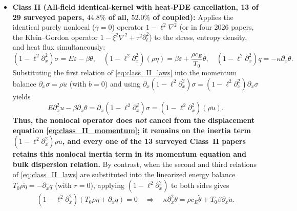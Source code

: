 \begin{itemize}[leftmargin=*]
  \item \textbf{Class II (All-field identical-kernel with heat-PDE cancellation, 13 of 29 surveyed papers, $44.8\%$ of all, $52.0\%$ of coupled):} Applies the identical purely nonlocal ($\gamma = 0$) operator $1 - \ell^2\nabla^2$ (or in four 2026 papers, the Klein--Gordon operator $1 - \xi^2\nabla^2 + \tau^2\partial_t^2$) to the stress, entropy density, and heat flux simultaneously:
  \begin{equation}\label{eq:class_II_laws}
    (1 - \ell^2\partial_x^2)\sigma = E\varepsilon - \beta\theta, \quad
    (1 - \ell^2\partial_x^2)(\rho\eta) = \beta\varepsilon + \frac{\rho c_E}{T_0}\theta, \quad
    (1 - \ell^2\partial_x^2)q = -\kappa\partial_x\theta.
  \end{equation}
  Substituting the first relation of \eqref{eq:class_II_laws} into the momentum balance $\partial_x\sigma = \rho\ddot{u}$ (with $b=0$) and using $\partial_x(1-\ell^2\partial_x^2)\sigma = (1-\ell^2\partial_x^2)\partial_x\sigma$ yields
  \begin{equation}\label{eq:class_II_momentum}
    E\partial_x^2 u - \beta\partial_x\theta = \partial_x(1 - \ell^2\partial_x^2)\sigma = (1 - \ell^2\partial_x^2)(\rho\ddot{u}).
  \end{equation}
  \textbf{Thus, the nonlocal operator does \emph{not} cancel from the displacement equation \eqref{eq:class_II_momentum}; it remains on the inertia term $(1-\ell^2\partial_x^2)\rho\ddot{u}$, and every one of the 13 surveyed Class~II papers retains this nonlocal inertia term in its momentum equation and bulk dispersion relation.} By contrast, when the second and third relations of \eqref{eq:class_II_laws} are substituted into the linearized energy balance $T_0\rho\dot{\eta} = -\partial_x q$ (with $r=0$), applying $(1-\ell^2\partial_x^2)$ to both sides gives
  \begin{equation}\label{eq:class_II_heat}
    (1 - \ell^2\partial_x^2)(T_0\rho\dot{\eta} + \partial_x q) = 0 \quad\Longrightarrow\quad \kappa\partial_x^2\theta = \rho c_E\dot{\theta} + T_0\beta\partial_x\dot{u}.
  \end{equation}

\end{itemize}
